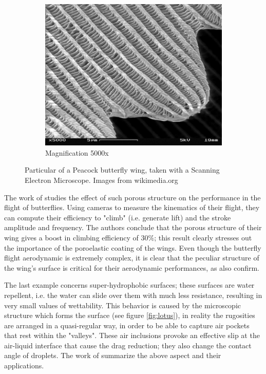\begin{figure}[h]
\begin{subfigure}[b]{0.3\textwidth}
	\end{subfigure}
	\begin{subfigure}[b]{0.3\textwidth}
		\includegraphics[width=\textwidth]{chapter_1/butterfly3}
		\caption{Magnification 5000x}
		\label{fig:b5000}
	\end{subfigure}
	\caption{Particular of a Peacock butterfly wing, taken with a Scanning Electron Microscope.  Images from wikimedia.org}
	\label{fig:butterfly}
\end{figure}

The work of \citet{slegers2017beneficial} studies the effect of such porous structure on the performance in the flight of butterflies.
Using cameras to measure the kinematics of their flight, they can compute their efficiency to "climb" (i.e. generate lift) and the stroke amplitude and frequency.
The authors conclude that the porous structure of their wing gives a boost in climbing efficiency of $30\%$; this result clearly stresses out the importance of the poroelastic coating of the wings. 
Even though the butterfly flight aerodynamic is extremely complex, it is clear that the peculiar structure of the wing's surface is critical for their aerodynamic performances, as also \citet{srygley2002unconventional} confirm.

The last example concerns super-hydrophobic surfaces; these surfaces are water repellent, i.e. the water can slide over them with much less resistance, resulting in very small values of wettability.
This behavior is caused by the microscopic structure which forms the surface (see figure \ref{fig:lotus}), in reality the rugosities are arranged in a quasi-regular way, in order to be able to capture air pockets that rest within the "valleys".
These air inclusions provoke an effective slip at the air-liquid interface that cause the drag reduction; they also change the contact angle of droplets.
The work of \citet{bottaro2003effect} summarize the above aspect and their applications.

